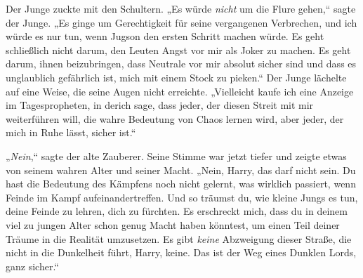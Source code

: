 Der Junge zuckte mit den Schultern. „Es würde \emph{nicht} um die Flure gehen,“ sagte der Junge. „Es ginge um Gerechtigkeit für seine vergangenen Verbrechen, und ich würde es nur tun, wenn Jugson den ersten Schritt machen würde. Es geht schließlich nicht darum, den Leuten Angst vor mir als Joker zu machen. Es geht darum, ihnen beizubringen, dass Neutrale vor mir absolut sicher sind und dass es unglaublich gefährlich ist, mich mit einem Stock zu pieken.“ Der Junge lächelte auf eine Weise, die seine Augen nicht erreichte. „Vielleicht kaufe ich eine Anzeige im Tagespropheten, in derich sage, dass jeder, der diesen Streit mit mir weiterführen will, die wahre Bedeutung von Chaos lernen wird, aber jeder, der mich in Ruhe lässt, sicher ist.“

„\emph{Nein},“ sagte der alte Zauberer. Seine Stimme war jetzt tiefer und zeigte etwas von seinem wahren Alter und seiner Macht. „Nein, Harry, das darf nicht sein. Du hast die Bedeutung des Kämpfens noch nicht gelernt, was wirklich passiert, wenn Feinde im Kampf aufeinandertreffen. Und so träumst du, wie kleine Jungs es tun, deine Feinde zu lehren, dich zu fürchten. Es erschreckt mich, dass du in deinem viel zu jungen Alter schon genug Macht haben könntest, um einen Teil deiner Träume in die Realität umzusetzen. Es gibt \emph{keine} Abzweigung dieser Straße, die nicht in die Dunkelheit führt, Harry, keine. Das ist der Weg eines Dunklen Lords, ganz sicher.“

